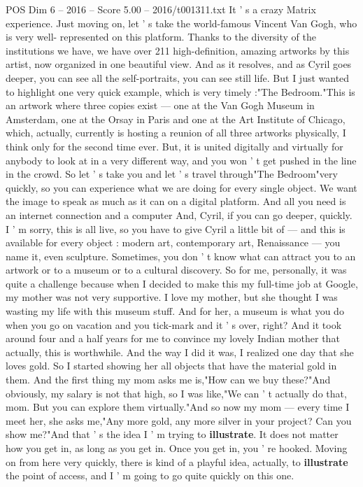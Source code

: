 \begin{textsample}{POS Dim 6 – 2016 – Score 5.00 – 2016/t001311.txt}
It ' s a crazy Matrix experience.
Just moving on, let ' s take the world-famous Vincent Van Gogh, who is very well- represented on this platform.
Thanks to the diversity of the institutions we have, we have over 211 high-definition, amazing artworks by this artist, now organized in one beautiful view.
And as it resolves, and as Cyril goes deeper, you can see all the self-portraits, you can see still life.
But I just wanted to highlight one very quick example, which is very timely :"The Bedroom."This is an artwork where three copies exist — one at the Van Gogh Museum in Amsterdam, one at the Orsay in Paris and one at the Art Institute of Chicago, which, actually, currently is hosting a reunion of all three artworks physically, I think only for the second time ever.
But, it is united digitally and virtually for anybody to look at in a very different way, and you won ' t get pushed in the line in the crowd.
So let ' s take you and let ' s travel through"The Bedroom"very quickly, so you can experience what we are doing for every single object.
We want the image to speak as much as it can on a digital platform.
And all you need is an internet connection and a computer And, Cyril, if you can go deeper, quickly.
I ' m sorry, this is all live, so you have to give Cyril a little bit of — and this is available for every object : modern art, contemporary art, Renaissance — you name it, even sculpture.
Sometimes, you don ' t know what can attract you to an artwork or to a museum or to a cultural discovery.
So for me, personally, it was quite a challenge because when I decided to make this my full-time job at Google, my mother was not very supportive.
I love my mother, but she thought I was wasting my life with this museum stuff.
And for her, a museum is what you do when you go on vacation and you tick-mark and it ' s over, right?
And it took around four and a half years for me to convince my lovely Indian mother that actually, this is worthwhile.
And the way I did it was, I realized one day that she loves gold.
So I started showing her all objects that have the material gold in them.
And the first thing my mom asks me is,"How can we buy these?"And obviously, my salary is not that high, so I was like,"We can ' t actually do that, mom.
But you can explore them virtually."And so now my mom — every time I meet her, she asks me,"Any more gold, any more silver in your project?
Can you show me?"And that ' s the idea I ' m trying to \textbf{illustrate}.
It does not matter how you get in, as long as you get in.
Once you get in, you ' re hooked.
Moving on from here very quickly, there is kind of a playful idea, actually, to \textbf{illustrate} the point of access, and I ' m going to go quite quickly on this one.

\end{textsample}
